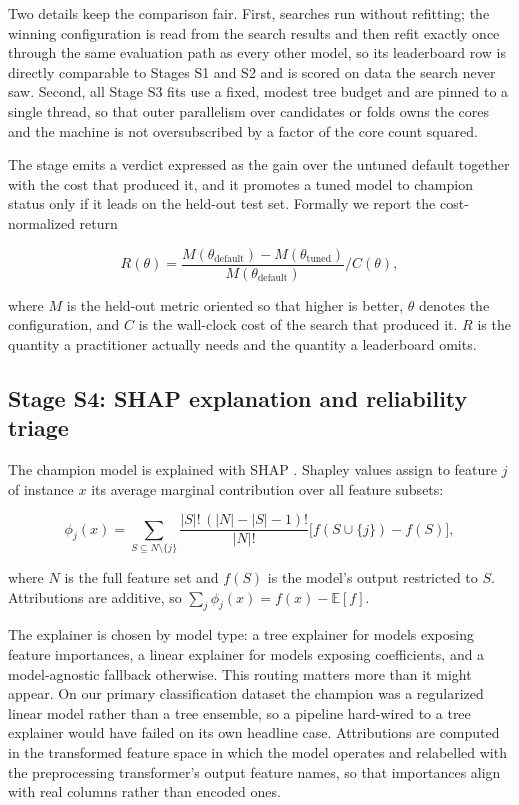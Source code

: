 \documentclass{ieeeaccess}
\begin{document}
Two details keep the comparison fair. First, searches run without refitting; the winning configuration is read from the search results and then refit exactly once through the same evaluation path as every other model, so its leaderboard row is directly comparable to Stages S1 and S2 and is scored on data the search never saw. Second, all Stage S3 fits use a fixed, modest tree budget and are pinned to a single thread, so that outer parallelism over candidates or folds owns the cores and the machine is not oversubscribed by a factor of the core count squared.

The stage emits a verdict expressed as the gain over the untuned default together with the cost that produced it, and it promotes a tuned model to champion status only if it leads on the held-out test set. Formally we report the cost-normalized return

\begin{equation}
R(\theta) = \frac{M(\theta_{\text{default}}) - M(\theta_{\text{tuned}})}{M(\theta_{\text{default}})} \Big/ C(\theta),
\label{eq:return}
\end{equation}

where $M$ is the held-out metric oriented so that higher is better, $\theta$ denotes the configuration, and $C$ is the wall-clock cost of the search that produced it. $R$ is the quantity a practitioner actually needs and the quantity a leaderboard omits.

\subsection{Stage S4: SHAP explanation and reliability triage}
The champion model is explained with SHAP \cite{lundberg2017unified}. Shapley values assign to feature $j$ of instance $x$ its average marginal contribution over all feature subsets:

\begin{equation}
\phi_j(x) = \sum_{S \subseteq N \setminus \{j\}} \frac{|S|!\,(|N|-|S|-1)!}{|N|!}\bigl[f(S \cup \{j\}) - f(S)\bigr],
\label{eq:shap}
\end{equation}

where $N$ is the full feature set and $f(S)$ is the model's output restricted to $S$. Attributions are additive, so $\sum_j \phi_j(x) = f(x) - \mathbb{E}[f]$.

The explainer is chosen by model type: a tree explainer for models exposing feature importances, a linear explainer for models exposing coefficients, and a model-agnostic fallback otherwise. This routing matters more than it might appear. On our primary classification dataset the champion was a regularized linear model rather than a tree ensemble, so a pipeline hard-wired to a tree explainer would have failed on its own headline case. Attributions are computed in the transformed feature space in which the model operates and relabelled with the preprocessing transformer's output feature names, so that importances align with real columns rather than encoded ones.
\end{document}
